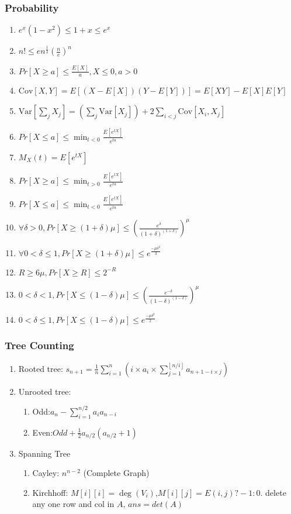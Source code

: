 \subsubsection{Probability}
\begin{enumerate}\itemsep = -3pt
	\item $e^x (1 - x^2) \leq 1 + x \leq e^x$
	\item $n! \leq en^{\frac{1}{2}} (\frac{n}{e})^n$
	\item $Pr[X \geq a] \leq \displaystyle\frac{E[X]}{a}, X \le 0, a > 0$
	\item $\text{Cov}[X, Y] = E[(X - E[X])(Y - E[Y])] = E[XY] - E[X]E[Y]$
	\item $\displaystyle \text{Var}[\sum_j X_j] = (\sum_j\text{Var}[X_j]) + 2\sum_{i < j}  \text{Cov}[X_i, X_j]$
	\item $Pr[X \leq a] \leq \displaystyle \min_{t < 0} \frac{E[e^{tX}]}{e^{ta}}$
	\item $M_X(t) = E[e^{tX}]$
	\item $Pr[X \geq a] \leq \displaystyle \min_{t > 0} \frac{E[e^{tX}]}{e^{ta}}$
	\item $Pr[X \leq a] \leq \displaystyle \min_{t < 0} \frac{E[e^{tX}]}{e^{ta}}$
	\item $\forall \delta > 0, Pr[X \geq (1 + \delta) \mu] \leq \displaystyle(\frac{e^{\delta}}{(1 + \delta)^{(1 + \delta)}})^\mu$
	\item $\forall 0 < \delta \leq 1, Pr[X \geq (1 + \delta) \mu] \leq  e^{\frac{-\mu\delta^2}{3}}$
	\item $R \geq 6\mu, Pr[X \geq R] \leq 2^{-R}$
	\item $0 < \delta < 1, Pr[X \leq (1 - \delta) \mu] \leq  (\frac{e^{-\delta}}{(1 - \delta)^{(1 - \delta)}})^{\mu}$
	\item $0 < \delta \le 1, Pr[X \leq (1 - \delta) \mu] \leq  e^{\frac{-\mu\delta^2}{2}}$
\end{enumerate}

\subsubsection{Tree Counting}
\begin{enumerate}\itemsep = -3pt
	\item Rooted tree: $s_{n+1}=\frac{1}{n}\sum_{i=1}^{n}(i\times a_i\times \sum_{j=1}^{\left \lfloor  n/i\right \rfloor} a_{n+1-i\times j})$
	\item Unrooted tree: 
	\begin{enumerate}\itemsep = -2pt
		\item Odd:$a_n-\sum_{i=1}^{n/2}a_ia_{n-i}$
		\item Even:$Odd+\frac{1}{2}a_{n/2}(a_{n/2}+1)$
	\end{enumerate}
	\item Spanning Tree
	\begin{enumerate}\itemsep = -2pt
		\item Cayley: $n^{n-2}$ (Complete Graph)
		\item Kirchhoff: $M[i][i]=\deg(V_i)$,$M[i][j]= E(i,j) ? -1 : 0$. delete any one row and col in $A$, $ans = det(A)$
	\end{enumerate}
\end{enumerate}

%